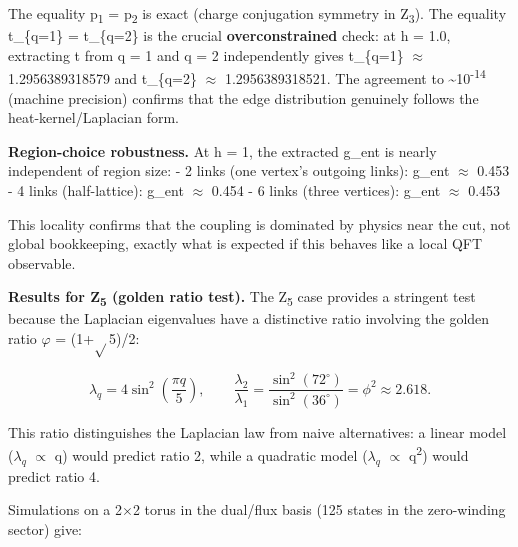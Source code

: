 \documentclass[11pt,a4paper]{article}
\theoremstyle{remark}
\begin{document}
The equality p\textsubscript{1} = p\textsubscript{2} is exact (charge conjugation symmetry in Z\textsubscript{3}).
The equality t\_\{q=1\} = t\_\{q=2\} is the crucial \textbf{overconstrained} check: at
h = 1.0, extracting t from q = 1 and q = 2 independently gives
t\_\{q=1\} \ensuremath{\approx} 1.2956389318579 and t\_\{q=2\} \ensuremath{\approx} 1.2956389318521. The
agreement to \textasciitilde10\textsuperscript{-14} (machine precision) confirms that the edge
distribution genuinely follows the heat-kernel/Laplacian form.

\textbf{Region-choice robustness.} At h = 1, the extracted g\_ent
is nearly independent of region size:
- 2 links (one vertex's outgoing links): g\_ent \ensuremath{\approx} 0.453
- 4 links (half-lattice): g\_ent \ensuremath{\approx} 0.454
- 6 links (three vertices): g\_ent \ensuremath{\approx} 0.453

This locality confirms that the coupling is dominated by physics near the cut,
not global bookkeeping, exactly what is expected if this behaves like a local
QFT observable.

\textbf{Results for Z\textsubscript{5} (golden ratio test).} The Z\textsubscript{5} case
provides a stringent test because the Laplacian eigenvalues have a distinctive
ratio involving the golden ratio \ensuremath{\varphi} = (1+\ensuremath{\sqrt{}}5)/2:

\[
\lambda_q = 4\sin^2\left(\frac{\pi q}{5}\right), \qquad
\frac{\lambda_2}{\lambda_1} = \frac{\sin^2(72^\circ)}{\sin^2(36^\circ)} = \phi^2 \approx 2.618.
\]

This ratio distinguishes the Laplacian law from naive alternatives: a linear
model ($\lambda_q$ \ensuremath{\propto} q) would predict ratio 2, while a quadratic model
($\lambda_q$ \ensuremath{\propto} q\textsuperscript{2}) would predict ratio 4.

Simulations on a 2\ensuremath{\times}2 torus in the dual/flux basis (125 states in the
zero-winding sector) give:
\end{document}

